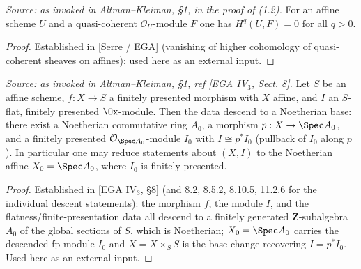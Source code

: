 \begin{theorem}
  \label{thm:ega_ext_affine_acyclic}
  \textit{Source: as invoked in Altman--Kleiman, §1, in the proof of (1.2).}
  For an affine scheme $U$ and a quasi-coherent $\mathcal{O}_U$-module $F$ one has
  $H^q(U, F) = 0$ for all $q > 0$.
  \begin{proof}
    Established in [Serre / EGA] (vanishing of higher cohomology of
    quasi-coherent sheaves on affines); used here as an external input.
  \end{proof}
\end{theorem}

\begin{theorem}
  \label{thm:ega_descent_noetherian}
  \textit{Source: as invoked in Altman--Kleiman, §1, ref [EGA IV$_3$, Sect. 8].}
  Let $S$ be an affine scheme, $f : X \to S$ a finitely presented morphism with
  $X$ affine, and $I$ an $S$-flat, finitely presented $\Ox$-module. Then the data
  descend to a Noetherian base: there exist a Noetherian commutative ring $A_0$,
  a morphism $p : X \to \Spec A_0$, and a finitely presented
  $\mathcal{O}_{\Spec A_0}$-module $I_0$ with $I \cong p^* I_0$ (pullback of
  $I_0$ along $p$). In particular one may reduce statements about $(X,I)$ to the
  Noetherian affine $X_0 = \Spec A_0$, where $I_0$ is finitely presented.
  \begin{proof}
    Established in [EGA IV$_3$, §8] (and 8.2, 8.5.2, 8.10.5, 11.2.6 for the
    individual descent statements): the morphism $f$, the module $I$, and the
    flatness/finite-presentation data all descend to a finitely generated
    $\mathbf{Z}$-subalgebra $A_0$ of the global sections of $S$, which is
    Noetherian; $X_0 = \Spec A_0$ carries the descended fp module $I_0$ and
    $X = X \times_{S} S$ is the base change recovering $I = p^* I_0$. Used here
    as an external input.
  \end{proof}
\end{theorem}

